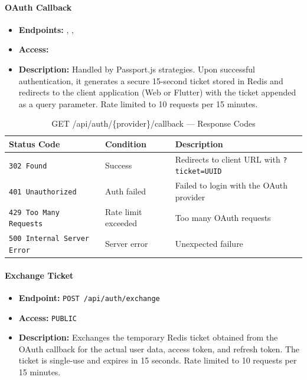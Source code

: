 \paragraph{OAuth Callback}
\label{subsubsec:oauth-callback}

\begin{itemize}
  \item \textbf{Endpoints:} 
  \texttt{}, 
  \texttt{}, 
  \texttt{}
  \item \textbf{Access:} \texttt{}
  \item \textbf{Description:} Handled by Passport.js strategies. Upon successful authentication, it generates a secure 15-second ticket stored in Redis and redirects to the client application (Web or Flutter) with the ticket appended as a query parameter. Rate limited to 10 requests per 15 minutes.
\end{itemize}

\begin{table}[H]
\centering
\renewcommand{\arraystretch}{1.3}
\begin{tabularx}{\textwidth}{|l|l|X|}
\hline
\textbf{Status Code} & \textbf{Condition} & \textbf{Description} \\
\hline
\texttt{302 Found}        & Success            & Redirects to client URL with \texttt{?ticket=UUID} \\
\hline
\texttt{401 Unauthorized} & Auth failed        & Failed to login with the OAuth provider \\
\hline
\texttt{429 Too Many Requests} & Rate limit exceeded & Too many OAuth requests \\
\hline
\texttt{500 Internal Server Error} & Server error & Unexpected failure \\
\hline
\end{tabularx}
\caption{GET /api/auth/\{provider\}/callback — Response Codes}
\label{tab:oauth-callback-responses}
\end{table}
\FloatBarrier

\paragraph{Exchange Ticket}
\label{subsubsec:exchange-ticket}

\begin{itemize}
  \item \textbf{Endpoint:} \texttt{POST /api/auth/exchange}
  \item \textbf{Access:} \texttt{PUBLIC}
  \item \textbf{Description:} Exchanges the temporary Redis ticket obtained from the OAuth callback for the actual user data, access token, and refresh token. The ticket is single-use and expires in 15 seconds. Rate limited to 10 requests per 15 minutes.
\end{itemize}

